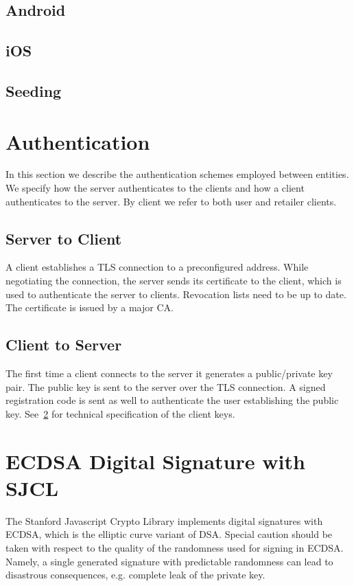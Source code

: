 \documentclass[a4paper,10pt]{article}
\begin{document}
\subsection{Android}

\subsection{iOS}

\subsection{Seeding}

\section{Authentication}
In this section we describe the authentication schemes employed between entities. We specify how the server authenticates to the clients and how a client authenticates to the 
server. By client we refer to both user and retailer clients. 

\subsection{Server to Client}
A client establishes a TLS connection to a preconfigured address. While negotiating the connection, the server sends its certificate to the client, which is used to authenticate 
the server to clients. Revocation lists need to be up to date. The certificate is issued by a major CA.

\subsection{Client to Server}
The first time a client connects to the server it generates a public/private key pair. The public key is sent to the server over the TLS connection. A signed registration code is 
sent as well to authenticate the user establishing the public key. See~\ref{sec:digital_signature} for technical specification of the client keys.

\section{ECDSA Digital Signature with SJCL}
\label{sec:digital_signature}

The Stanford Javascript Crypto Library implements digital signatures with ECDSA, which is the elliptic curve variant of DSA. Special caution should be taken with respect to the 
quality of the randomness used for signing in ECDSA. Namely, a single generated signature with predictable randomness can lead to disastrous consequences, e.g. complete leak of 
the private key.
\end{document}
